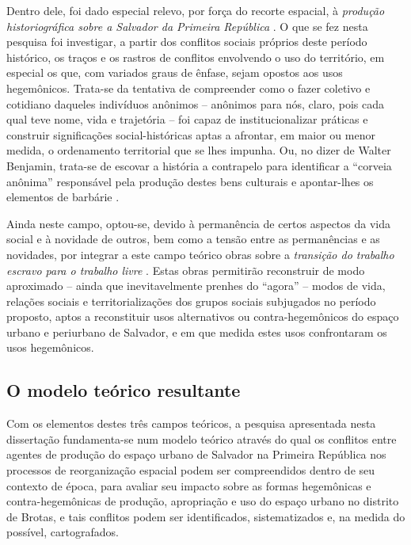 Dentro dele, foi dado especial relevo, por força do recorte espacial, à \textit{produção historiográfica sobre a Salvador da Primeira República} \cite{araujo_inventario_1992, castellucci_maquina_2008, CUNHA2011, sampaio_partidos_1978, sampaio_legislativo_1985, santos_associacao_1985, pang_coronelismo_1979}. O que se fez nesta pesquisa foi investigar, a partir dos conflitos sociais próprios deste período histórico, os traços e os rastros de conflitos envolvendo o uso do território, em especial os que, com variados graus de ênfase, sejam opostos aos usos hegemônicos. Trata-se da tentativa de compreender como o fazer coletivo e cotidiano daqueles indivíduos anônimos – anônimos para nós, claro, pois cada qual teve nome, vida e trajetória – foi capaz de institucionalizar práticas \cite{BERNARDO1991} e construir significações social-históricas \cite{CASTORIADIS1982} aptas a afrontar, em maior ou menor medida, o ordenamento territorial que se lhes impunha. Ou, no dizer de Walter Benjamin, trata-se de escovar a história a contrapelo para identificar a ``corveia anônima'' responsável pela produção destes bens culturais e apontar-lhes os elementos de barbárie \cite[p.~225]{BENJAMIN1987}.

Ainda neste campo, optou-se, devido à permanência de certos aspectos da vida social e à novidade de outros, bem como a tensão entre as permanências e as novidades, por integrar a este campo teórico obras sobre a \textit{transição do trabalho escravo para o trabalho livre }\cite{ANDRADE1988, AZEVEDO2004, brito2003abolicao, COSTA1991, DIAS2004, HOLTHE2003, mata2007libertos, MATTOS2008, MATTOSO1978, MATTOSO1992, MATTOSO1988, menezesfilho2007pos, MOURA1981, NASCIMENTO2007, REIS2000, REIS2004males, REISGOMES1996, REISSILVA1989, REIS2012, COSTA1989}. Estas obras permitirão reconstruir de modo aproximado – ainda que inevitavelmente prenhes do ``agora'' \cite[p.~229-230]{BENJAMIN1987} – modos de vida, relações sociais e territorializações dos grupos sociais subjugados no período proposto, aptos a reconstituir usos alternativos ou contra-hegemônicos do espaço urbano e periurbano de Salvador, e em que medida estes usos confrontaram os usos hegemônicos.

\subsection{O modelo teórico resultante}
\label{subsec:modteoresult}

Com os elementos destes três campos teóricos, a pesquisa apresentada nesta dissertação fundamenta-se num modelo teórico através do qual os conflitos entre agentes de produção do espaço urbano de Salvador na Primeira República nos processos de reorganização espacial podem ser compreendidos dentro de seu contexto de época, para avaliar seu impacto sobre as formas hegemônicas e contra-hegemônicas de produção, apropriação e uso do espaço urbano no distrito de Brotas, e tais conflitos podem ser identificados, sistematizados e, na medida do possível, cartografados.


